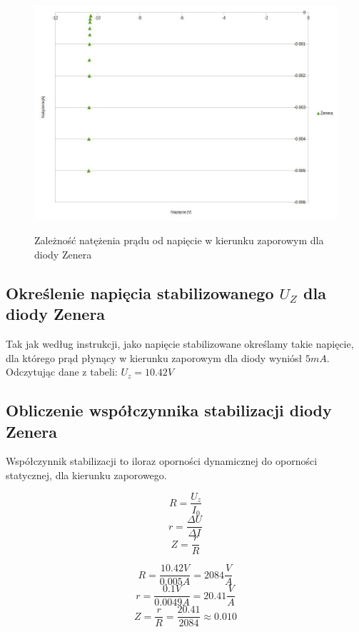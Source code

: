 \documentclass{article}
\begin{document}
\begin{figure}[h]
	\centering
	\includegraphics[scale=0.3]{lab02ch06}
	\label{fig:ch03}
	\caption{Zależność  natężenia prądu od napięcie w kierunku zaporowym dla diody Zenera}
\end{figure}

\subsection{Określenie napięcia stabilizowanego $U_{Z}$ dla diody Zenera}

Tak jak według instrukcji, jako napięcie stabilizowane określamy takie napięcie, dla którego prąd płynący w kierunku zaporowym dla diody wyniósł $5mA$. Odczytując dane z tabeli: $U_{z} = 10.42 V$

\subsection{Obliczenie współczynnika stabilizacji diody Zenera}

Współczynnik stabilizacji to iloraz oporności dynamicznej do oporności statycznej, dla kierunku zaporowego.

\begin{equation}
	R = \frac{U_{z}}{I_{0}}
\end{equation}
\begin{equation}
	r = \frac{\Delta U}{\Delta I}
\end{equation}
\begin{equation}
	Z = \frac{r}{R}
\end{equation}

\[R = \frac{10.42V}{0.005A} = 2084 \frac{V}{A} \]
\[r = \frac{0.1 V}{0.0049 A} = 20.41 \frac{V}{A}\]
\[Z = \frac{r}{R} = \frac{20.41}{2084} \approx 0.010\]
\end{document}
